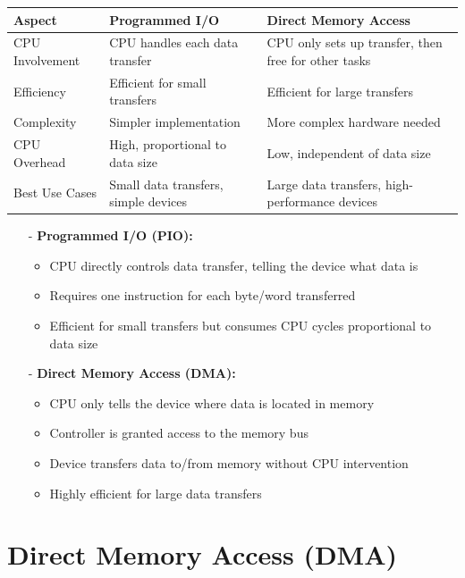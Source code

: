 \documentclass[../../compsys.tex]{subfiles}
\begin{document}
\begin{center}
\begin{tabular}{|p{2.5cm}|p{5cm}|p{5cm}|}
\hline
\textbf{Aspect} & \textbf{Programmed I/O} & \textbf{Direct Memory Access} \\
\hline
CPU Involvement & CPU handles each data transfer & CPU only sets up transfer, then free for other tasks \\
\hline
Efficiency & Efficient for small transfers & Efficient for large transfers \\
\hline
Complexity & Simpler implementation & More complex hardware needed \\
\hline
CPU Overhead & High, proportional to data size & Low, independent of data size \\
\hline
Best Use Cases & Small data transfers, simple devices & Large data transfers, high-performance devices \\
\hline
\end{tabular}
\end{center}
\begin{itemize}
    \item[-] \textbf{Programmed I/O (PIO):}
    \begin{itemize}
        \item CPU directly controls data transfer, telling the device what data is
        \item Requires one instruction for each byte/word transferred
        \item Efficient for small transfers but consumes CPU cycles proportional to data size
    \end{itemize}
    \item[-] \textbf{Direct Memory Access (DMA):}
    \begin{itemize}
        \item CPU only tells the device where data is located in memory
        \item Controller is granted access to the memory bus
        \item Device transfers data to/from memory without CPU intervention
        \item Highly efficient for large data transfers
    \end{itemize}
\end{itemize}

\section{Direct Memory Access (DMA)}
\end{document}
